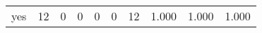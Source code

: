 \begin{longtable}{lp{2.0cm}p{2.0cm}p{2.0cm}p{2.0cm}p{2.0cm}p{2.0cm}p{2.0cm}p{2.0cm}p{2.0cm}}
yes       &                     12 &                                             0 &                                            0 &                                           0 &                                            0 &                                         12 &                                1.000 &                                  1.000 &                                1.000 \\
\end{longtable}
